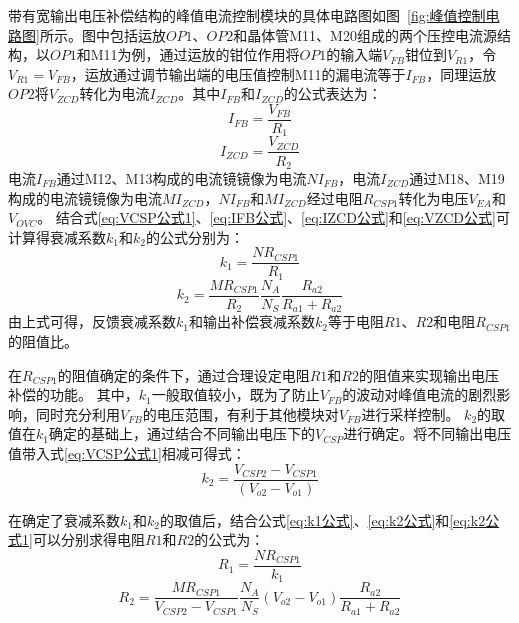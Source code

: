 带有宽输出电压补偿结构的峰值电流控制模块的具体电路图如图~\ref{fig:峰值控制电路图}所示。图中包括运放$OP1$、$OP2$和晶体管M11、M20组成的两个压控电流源结构，以$OP1$和M11为例，通过运放的钳位作用将$OP1$的输入端$V_{FB}$钳位到$V_{R1}$，令$V_{R1}=V_{FB}$，运放通过调节输出端的电压值控制M11的漏电流等于$I_{FB}$，同理运放$OP2$将$V_{ZCD}$转化为电流$I_{ZCD}$。其中$I_{FB}$和$I_{ZCD}$的公式表达为：
\begin{equation}
    \label{eq:IFB公式}
    I_{FB} = \frac{V_{FB}}{R_1}
\end{equation}
\begin{equation}
    \label{eq:IZCD公式}
    I_{ZCD} = \frac{V_{ZCD}}{R_2}
\end{equation}
电流$I_{FB}$通过M12、M13构成的电流镜镜像为电流$NI_{FB}$，电流$I_{ZCD}$通过M18、M19构成的电流镜镜像为电流$MI_{ZCD}$，$NI_{FB}$和$MI_{ZCD}$经过电阻$R_{CSP1}$转化为电压$V_{EA}$和$V_{OVC}$。
结合式\eqref{eq:VCSP公式1}、\eqref{eq:IFB公式}、\eqref{eq:IZCD公式}和\eqref{eq:VZCD公式}可计算得衰减系数$k_1$和$k_2$的公式分别为：
\begin{equation}
    \label{eq:k1公式}
    k_{1} = \frac{N R_{CSP1}}{R_1}
\end{equation}
\begin{equation}
    \label{eq:k2公式}
    k_{2} = \frac{M R_{CSP1}}{R_2} \frac{N_A}{N_S} \frac{R_{a2}}{R_{a1} + R_{a2}}
\end{equation}
由上式可得，反馈衰减系数$k_1$和输出补偿衰减系数$k_2$等于电阻$R1$、$R2$和电阻$R_{CSP1}$的阻值比。

在$R_{CSP1}$的阻值确定的条件下，通过合理设定电阻$R1$和$R2$的阻值来实现输出电压补偿的功能。
其中，$k_1$一般取值较小，既为了防止$V_{FB}$的波动对峰值电流的剧烈影响，同时充分利用$V_{FB}$的电压范围，有利于其他模块对$V_{FB}$进行采样控制。
$k_2$的取值在$k_1$确定的基础上，通过结合不同输出电压下的$V_{CSP}$进行确定。将不同输出电压值带入式\eqref{eq:VCSP公式1}相减可得式：
\begin{equation}
    \label{eq:k2公式1}
    k_2 = \frac{V_{CSP2}-V_{CSP1}}{ (V_{o2} - V_{o1}) } 
\end{equation}

在确定了衰减系数$k_1$和$k_2$的取值后，结合公式\eqref{eq:k1公式}、\eqref{eq:k2公式}和\eqref{eq:k2公式1}可以分别求得电阻$R1$和$R2$的公式为：
\begin{equation}
    \label{eq:R1公式}
    R_1 = \frac{NR_{CSP1}}{k_1}
\end{equation}
\begin{equation}
    \label{eq:R2公式}
    R_2 = \frac{M R_{CSP1}}{V_{CSP2}-V_{CSP1}} \frac{N_A}{N_S} (V_{o2}-V_{o1}) \frac{R_{a2}}{R_{a1}+R_{a2}}
\end{equation}

